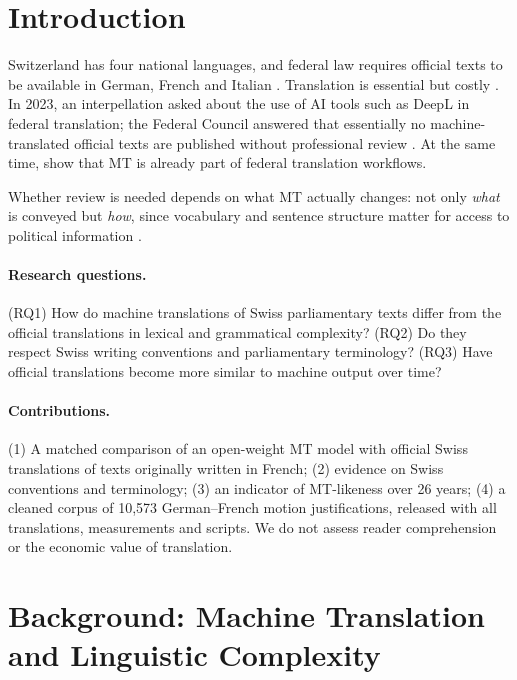\documentclass[11pt,a4paper]{article}
\begin{document}
\section{Introduction}
\label{sec:intro}

Switzerland has four national languages, and federal law requires official
texts to be available in German, French and Italian \citep{bk_languages}.
Translation is essential but costly \citep{efd2024}. In 2023, an interpellation
asked about the use of AI tools such as DeepL in federal translation; the
Federal Council answered that essentially no machine-translated official texts
are published without professional review \citep{sommaruga2023}. At the same
time, \citet{canavese2024} show that MT is already part of federal translation
workflows.

Whether review is needed depends on what MT actually changes: not only
\emph{what} is conveyed but \emph{how}, since vocabulary and sentence structure
matter for access to political information \citep{tolochko2019}.

\paragraph{Research questions.}
(RQ1) How do machine translations of Swiss parliamentary texts differ from the
official translations in lexical and grammatical complexity?
(RQ2) Do they respect Swiss writing conventions and parliamentary terminology?
(RQ3) Have official translations become more similar to machine output over time?

\paragraph{Contributions.}
(1) A matched comparison of an open-weight MT model with official Swiss
translations of texts originally written in French; (2) evidence on Swiss
conventions and terminology; (3) an indicator of MT-likeness over 26 years;
(4) a cleaned corpus of 10,573 German--French motion justifications, released
with all translations, measurements and scripts. We do not assess reader
comprehension or the economic value of translation.

\section{Background: Machine Translation and Linguistic Complexity}
\label{sec:related}
\end{document}
